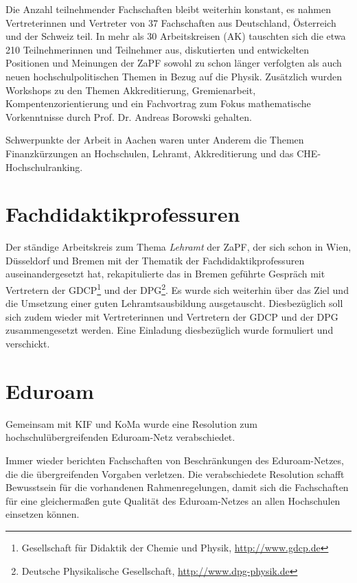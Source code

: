 \documentclass{scrartcl}
\renewcommand{\headrulewidth}{0pt}
\begin{document}
Die Anzahl teilnehmender Fachschaften bleibt weiterhin konstant, es nahmen
Vertreterinnen und Vertreter von 37 Fachschaften aus Deutschland, Österreich
und der Schweiz teil.  In mehr als 30 Arbeitskreisen (AK) tauschten sich die
etwa 210 Teilnehmerinnen und Teilnehmer aus, diskutierten und entwickelten
Positionen und Meinungen der ZaPF sowohl zu schon länger verfolgten  als auch
neuen hochschulpolitischen Themen in Bezug auf die Physik. Zusätzlich wurden
Workshops zu den Themen Akkreditierung, Gremienarbeit, Kompentenzorientierung
und ein Fachvortrag zum Fokus mathematische Vorkenntnisse durch Prof. Dr.
Andreas Borowski  gehalten.

Schwerpunkte der Arbeit in Aachen waren unter Anderem die Themen Finanzkürzungen
an Hochschulen, Lehramt, Akkreditierung und das CHE-Hochschulranking.

\pagebreak
\renewcommand{\headrulewidth}{0.1pt}
\rhead{\thepage}


\section*{Fachdidaktikprofessuren}

Der  ständige  Arbeitskreis zum Thema \emph{Lehramt} der ZaPF, der sich schon
in Wien, Düsseldorf und Bremen mit  der Thematik der Fachdidaktikprofessuren
auseinandergesetzt hat, rekapitulierte das in Bremen geführte Gespräch mit
Vertretern der GDCP\footnote{Gesellschaft für Didaktik der Chemie und Physik,
\href{http://www.gdcp.de}{\url{http://www.gdcp.de}}} und der DPG\footnote{Deutsche Physikalische Gesellschaft, \href{http://www.dpg-physik.de}{\url{http://www.dpg-physik.de}}}.
Es wurde sich weiterhin über  das Ziel und die Umsetzung einer guten
Lehramtsausbildung ausgetauscht.  Diesbezüglich soll sich zudem wieder mit
Vertreterinnen und Vertretern der GDCP und der DPG    zusammengesetzt werden.
Eine Einladung diesbezüglich wurde formuliert und verschickt.

\section*{Eduroam}

Gemeinsam mit KIF und KoMa wurde eine Resolution zum hochschulübergreifenden
Eduroam-Netz verabschiedet.

Immer wieder berichten Fachschaften von Beschränkungen des Eduroam-Netzes, die
die übergreifenden Vorgaben verletzen. Die verabschiedete Resolution schafft
Bewusstsein für die vorhandenen Rahmenregelungen, damit sich die Fachschaften
für eine gleichermaßen gute Qualität des Eduroam-Netzes an allen Hochschulen
einsetzen können.
\end{document}
